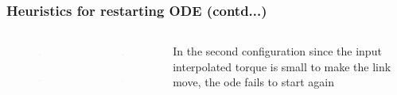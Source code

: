 \documentclass[10pt,aspectratio=169]{beamer}
\begin{document}
\begin{frame}
\frametitle{Heuristics for restarting ODE (contd...)}
\begin{columns}
	\begin{column}{4cm}
		\begin{figure}
			\centering
			\includegraphics[width=3.5cm,keepaspectratio]{rockerCrank1position}
		\end{figure}
		\begin{figure}
			\centering
			\includegraphics[width=3.5cm,keepaspectratio]{rockerCrank1TorqueInput}
	\end{figure}
	\end{column}
	\begin{column}{4cm}
		\begin{figure}
			\centering
			\includegraphics[width=3.5cm,keepaspectratio]{rockerCrank2position}
		\end{figure}
		\begin{figure}
			\centering
			\includegraphics[width=3.5cm,keepaspectratio]{rockerCrank2TorqueInput}
		\end{figure}
	\end{column}
	\begin{column}{5cm}
		{\small In the second configuration since the input interpolated torque is small to make the link move, the ode fails to start again}
	\end{column}
\end{columns}
\end{frame}
\end{document}
